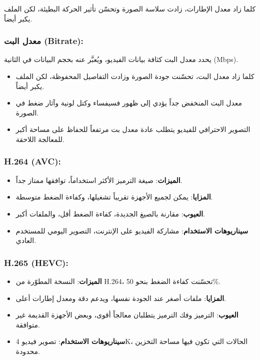 كلما زاد معدل الإطارات، زادت سلاسة الصورة وتحسّن تأثير الحركة البطيئة، لكن الملف يكبر أيضاً.

\subsubsection*{معدل البت (Bitrate):}

يحدد معدل البت كثافة بيانات الفيديو، ويُعبَّر عنه بحجم البيانات في الثانية (Mbps).

\begin{itemize}
  \item كلما زاد معدل البت، تحسّنت جودة الصورة وزادت التفاصيل المحفوظة، لكن الملف يكبر أيضاً.
  \item معدل البت المنخفض جداً يؤدي إلى ظهور فسيفساء وكتل لونية وآثار ضغط في الصورة.
  \item التصوير الاحترافي للفيديو يتطلب عادة معدل بت مرتفعاً للحفاظ على مساحة أكبر للمعالجة اللاحقة.
\end{itemize}


\subsubsection*{H.264 (AVC):}

\begin{itemize}
  \item \textbf{الميزات}: صيغة الترميز الأكثر استخداماً، توافقها ممتاز جداً.
  \item \textbf{المزايا}: يمكن لجميع الأجهزة تقريباً تشغيلها، وكفاءة الضغط متوسطة.
  \item \textbf{العيوب}: مقارنة بالصيغ الجديدة، كفاءة الضغط أقل، والملفات أكبر.
  \item \textbf{سيناريوهات الاستخدام}: مشاركة الفيديو على الإنترنت، التصوير اليومي للمستخدم العادي.
\end{itemize}

\subsubsection*{H.265 (HEVC):}

\begin{itemize}
  \item \textbf{الميزات}: النسخة المطوّرة من H.264، تحسّنت كفاءة الضغط بنحو 50\%.
  \item \textbf{المزايا}: ملفات أصغر عند الجودة نفسها، ويدعم دقة ومعدل إطارات أعلى.
  \item \textbf{العيوب}: الترميز وفك الترميز يتطلبان معالجاً أقوى، وبعض الأجهزة القديمة غير متوافقة.
  \item \textbf{سيناريوهات الاستخدام}: تصوير فيديو 4K، الحالات التي تكون فيها مساحة التخزين محدودة.
\end{itemize}

